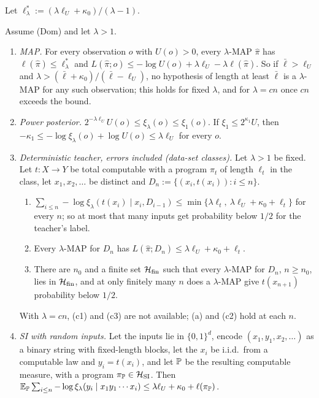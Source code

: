 Let $\ell^*_\lambda:=(\lambda\ell_U+\kappa_0)/(\lambda-1)$.

\begin{theorem}[Absorption]\label{thm:absorb:absorption}
Assume (Dom) and let $\lambda>1$.
\begin{enumerate}[label=(\alph*),itemsep=0pt,topsep=2pt]
\item \emph{MAP.} For every observation $o$ with $U(o)>0$, every $\lambda$-MAP $\hat\pi$ has $\ell(\hat\pi)\le\ell^*_\lambda$ and $L(\hat\pi;o)\le-\log U(o)+\lambda\ell_U-\lambda\ell(\hat\pi)$. So if $\bar\ell>\ell_U$ and $\lambda>(\bar\ell+\kappa_0)/(\bar\ell-\ell_U)$, no hypothesis of length at least $\bar\ell$ is a $\lambda$-MAP for any such observation; this holds for fixed $\lambda$, and for $\lambda=cn$ once $cn$ exceeds the bound.
\item \emph{Power posterior.} $2^{-\lambda\ell_U}U(o)\le\xi_\lambda(o)\le\xi_1(o)$. If $\xi_1\le2^{\kappa_1}U$, then $-\kappa_1\le-\log\xi_\lambda(o)+\log U(o)\le\lambda\ell_U$ for every $o$.
\item \emph{Deterministic teacher, errors included (data-set classes).} Let $\lambda>1$ be fixed. Let $t:X\to Y$ be total computable with a program $\pi_t$ of length $\ell_t$ in the class, let $x_1,x_2,\dots$ be distinct and $D_n:=\{(x_i,t(x_i)):i\le n\}$.
\begin{enumerate}[label=(c\arabic*),itemsep=0pt,topsep=0pt]
\item $\sum_{i\le n}-\log\xi_\lambda(t(x_i)\mid x_i,D_{i-1})\le\min\{\lambda\ell_t,\ \lambda\ell_U+\kappa_0+\ell_t\}$ for every $n$; so at most that many inputs get probability below $1/2$ for the teacher's label.
\item Every $\lambda$-MAP for $D_n$ has $L(\hat\pi;D_n)\le\lambda\ell_U+\kappa_0+\ell_t$.
\item There are $n_0$ and a finite set $\mathcal H_{\rm fin}$ such that every $\lambda$-MAP for $D_n$, $n\ge n_0$, lies in $\mathcal H_{\rm fin}$, and at only finitely many $n$ does a $\lambda$-MAP give $t(x_{n+1})$ probability below $1/2$.
\end{enumerate}
With $\lambda=cn$, (c1) and (c3) are not available; (a) and (c2) hold at each $n$.
\item \emph{SI with random inputs.} Let the inputs lie in $\{0,1\}^d$, encode $(x_1,y_1,x_2,\dots)$ as a binary string with fixed-length blocks, let the $x_i$ be i.i.d.\ from a computable law and $y_i=t(x_i)$, and let $\mathbb{P}$ be the resulting computable measure, with a program $\pi_{\mathbb{P}}\in\mathcal{H}_{\mathrm{SI}}$. Then $\mathbb{E}_{\mathbb{P}}\sum_{i\le n}-\log\xi_\lambda(y_i\mid x_1y_1\cdots x_i)\le\lambda\ell_U+\kappa_0+\ell(\pi_{\mathbb{P}})$.
\end{enumerate}
\end{theorem}

